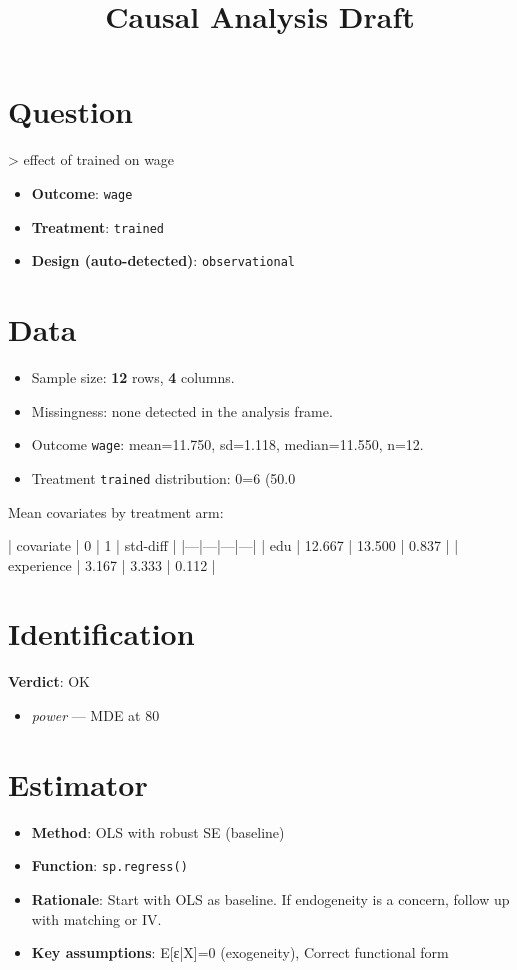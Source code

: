 \documentclass{article}
\title{Causal Analysis Draft}
\begin{document}
\maketitle

\section{Question}
> effect of trained on wage

\begin{itemize}
  \item \textbf{Outcome}: \texttt{wage}
  \item \textbf{Treatment}: \texttt{trained}
  \item \textbf{Design (auto-detected)}: \texttt{observational}
\end{itemize}


\section{Data}
\begin{itemize}
  \item Sample size: \textbf{12} rows, \textbf{4} columns.
  \item Missingness: none detected in the analysis frame.
  \item Outcome \texttt{wage}: mean=11.750, sd=1.118, median=11.550, n=12.
  \item Treatment \texttt{trained} distribution: 0=6 (50.0%
\end{itemize}

Mean covariates by treatment arm:

| covariate | 0 | 1 | std-diff |
|---|---|---|---|
| edu | 12.667 | 13.500 | 0.837 |
| experience | 3.167 | 3.333 | 0.112 |

\section{Identification}
\textbf{Verdict}: OK

\begin{itemize}
  \item [INFO] \emph{power} — MDE at 80%
\end{itemize}

\section{Estimator}
\begin{itemize}
  \item \textbf{Method}: OLS with robust SE (baseline)
  \item \textbf{Function}: \texttt{sp.regress()}
  \item \textbf{Rationale}: Start with OLS as baseline. If endogeneity is a concern, follow up with matching or IV.
  \item \textbf{Key assumptions}: E[ε|X]=0 (exogeneity), Correct functional form
\end{itemize}
\end{document}
